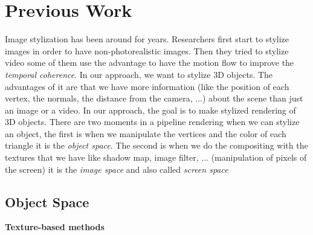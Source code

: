 \chapter{Previous Work}

Image stylization has been around for years. Researchers first start to stylize images \cite{litwinowicz_processing_1997, hays_image_2004, rosin_stroke_2013, zeng_image_2009, kyprianidis_image_2009, lu_interactive_2010, litwinowicz_processing_1997, kyprianidis_state_2013} in order to have non-photorealistic images. Then they tried to stylize video\cite{lin_video_nodate, litwinowicz_processing_1997, kyprianidis_state_2013, bousseau_video_2007} some of them use the advantage to have the motion flow to improve the \textit{temporal coherence}. In our approach, we want to stylize 3D objects. The advantages of it are that we have more information (like the position of each vertex, the normals, the distance from the camera, ...) about the scene than just an image or a video. In our approach, the goal is to make stylized rendering of 3D objects. There are two moments in a pipeline rendering when we can stylize an object, the first is when we manipulate the vertices and the color of each triangle it is the \textit{object space}. The second is when we do the compositing with the textures that we have like shadow map, image filter, ... (manipulation of pixels of the screen) it is the \textit{image space} and also called \textit{screen space}

\section{Object Space}


\textbf{Texture-based methods}


